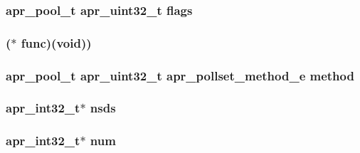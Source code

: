 \subsubsection[{\texorpdfstring{flags}{flags}}]{ {\bf apr\+\_\+pool\+\_\+t} {\bf apr\+\_\+uint32\+\_\+t} flags}\hypertarget{group__apr__poll_gaf8cd8dfff060e0cd10e32063eef7d30c}{}\label{group__apr__poll_gaf8cd8dfff060e0cd10e32063eef7d30c}
\subsubsection[{\texorpdfstring{func}{func}}]{($\ast$ func)({\bf void}))}\hypertarget{group__apr__poll_ga54230532a60ed2ae9f1e0b136b57cc42}{}\label{group__apr__poll_ga54230532a60ed2ae9f1e0b136b57cc42}
\subsubsection[{\texorpdfstring{method}{method}}]{ {\bf apr\+\_\+pool\+\_\+t} {\bf apr\+\_\+uint32\+\_\+t} {\bf apr\+\_\+pollset\+\_\+method\+\_\+e} method}\hypertarget{group__apr__poll_ga6c1b16298acdfc2ca3cba871da0daa17}{}\label{group__apr__poll_ga6c1b16298acdfc2ca3cba871da0daa17}
\subsubsection[{\texorpdfstring{nsds}{nsds}}]{ {\bf apr\+\_\+int32\+\_\+t}$\ast$ nsds}\hypertarget{group__apr__poll_ga4bc69a0e7bde2687820998e3ef6cb906}{}\label{group__apr__poll_ga4bc69a0e7bde2687820998e3ef6cb906}
\subsubsection[{\texorpdfstring{num}{num}}]{ {\bf apr\+\_\+int32\+\_\+t}$\ast$ num}\hypertarget{group__apr__poll_ga8c10598f743ada9822ab203974a58304}{}\label{group__apr__poll_ga8c10598f743ada9822ab203974a58304}
